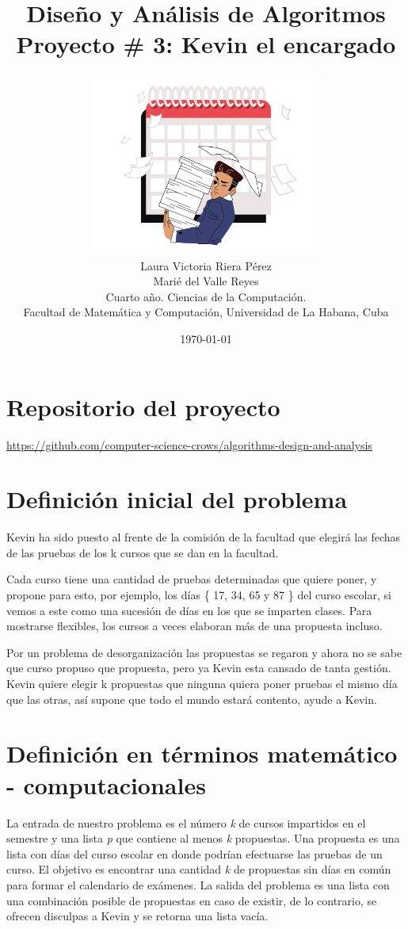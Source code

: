 \documentclass[10pt]{article} %
\title{\normalsize{Dise\~no y An\'alisis de Algoritmos }\\
	\Huge\bfseries Proyecto \# 3: Kevin el encargado \\
} %
\author{%
	\includegraphics[height=6cm]{logo.png} \vspace{1em}\\
	Laura Victoria Riera P\'erez\\
	Mari\'e del Valle Reyes \vspace{1em} \\
	\small Cuarto a\~no. Ciencias de la Computaci\'on. \\ %
	\small Facultad de Matem\'atica y Computaci\'on, Universidad de La Habana, Cuba \\ %
}
\date{\footnotesize \today } %
\begin{document}
	\maketitle
	
	
	\section{Repositorio del proyecto}
	
	\begin{center}
		\href{https://github.com/computer-science-crows/algorithms-design-and-analysis}{https://github.com/computer-science-crows/algorithms-design-and-analysis}
	\end{center}

	\section{Definici\'on inicial del problema} 

	Kevin ha sido puesto al frente de la comisión de la facultad que elegirá las fechas de las pruebas de los k cursos que se dan en la facultad.
	
	Cada curso tiene una cantidad de pruebas determinadas que quiere poner, y propone para esto, por ejemplo, los días \{ 17, 34, 65 y 87 \} del curso escolar, si vemos a este como una sucesión de días en los que se imparten clases. Para mostrarse flexibles, los cursos a veces elaboran más de una propuesta incluso.
	
	Por un problema de desorganización las propuestas se regaron y ahora no se sabe que curso propuso que propuesta, pero ya Kevin esta cansado de tanta gestión. Kevin quiere elegir k propuestas que ninguna quiera poner pruebas el mismo día que las otras, así supone que todo el mundo estará contento, ayude a Kevin.
	

	\section{Definici\'on en t\'erminos matem\'atico - computacionales}\label{section_2}
	
	La entrada de nuestro problema es el n\'umero \textit{k} de cursos impartidos en el semestre y una lista \textit{p} que contiene al menos \textit{k} propuestas. Una propuesta es una lista con d\'ias del curso escolar en donde podr\'ian efectuarse las pruebas de un curso. El objetivo es encontrar una cantidad \textit{k} de propuestas sin d\'ias en com\'un para formar el calendario de ex\'amenes. La salida del problema es una lista con una combinaci\'on posible de propuestas en caso de existir, de lo contrario, se ofrecen disculpas a Kevin y se retorna una lista vac\'ia.
	
\end{document}
